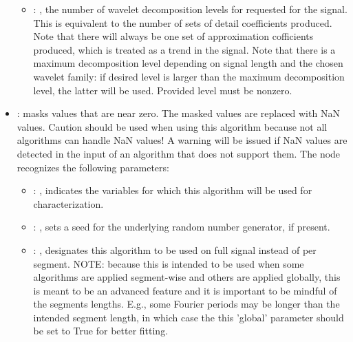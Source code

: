 \begin{itemize}
\begin{itemize}
        \item {}: ,
          the number of wavelet decomposition levels for requested for the signal. This is
          equivalent to                     the number of sets of detail coefficients produced. Note
          that there will always be one set of                     approximation cofficients
          produced, which is treated as a trend in the signal. Note that there is a
          maximum decomposition level depending on signal length and the chosen wavelet family: if
          desired                     level is larger than the maximum decomposition level, the
          latter will be used. Provided level must                     be nonzero.
      \end{itemize}

    \item {}:
      masks values that are near zero. The masked values are replaced with NaN     values. Caution
      should be used when using this algorithm because not all algorithms can handle     NaN values!
      A warning will be issued if NaN values are detected in the input of an algorithm that     does
      not support them.
      The  node recognizes the following parameters:
        \begin{itemize}
          \item {}: ,
            indicates the variables for which this algorithm will be used for characterization.
          \item {}: ,
            sets a seed for the underlying random number generator, if present.
          \item {}: ,
            designates this algorithm to be used on full signal instead of per
            segment. NOTE: because this is intended to be used when some algorithms are
            applied segment-wise and others are applied globally, this is meant to be an
            advanced feature and it is important to be mindful of the segments lengths.
            E.g., some Fourier periods may be longer than the intended segment length, in
            which case the this 'global' parameter should be set to True for better
            fitting. 
      \end{itemize}


\end{itemize}
